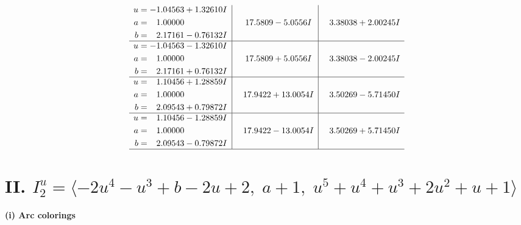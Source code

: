 \documentclass[1p]{elsarticle_modified}
\theoremstyle{definition}
\begin{document}
$$\begin{array}{c|c|c}
\begin{aligned}
u &= -1.04563 + 1.32610 I \\
a &= \phantom{-}1.00000\phantom{ +0.000000I} \\
b &= \phantom{-}2.17161 - 0.76132 I\end{aligned}
 & \phantom{-}17.5809 - 5.0556 I & \phantom{-}3.38038 + 2.00245 I \\ \hline\begin{aligned}
u &= -1.04563 - 1.32610 I \\
a &= \phantom{-}1.00000\phantom{ +0.000000I} \\
b &= \phantom{-}2.17161 + 0.76132 I\end{aligned}
 & \phantom{-}17.5809 + 5.0556 I & \phantom{-}3.38038 - 2.00245 I \\ \hline\begin{aligned}
u &= \phantom{-}1.10456 + 1.28859 I \\
a &= \phantom{-}1.00000\phantom{ +0.000000I} \\
b &= \phantom{-}2.09543 + 0.79872 I\end{aligned}
 & \phantom{-}17.9422 + 13.0054 I & \phantom{-}3.50269 - 5.71450 I \\ \hline\begin{aligned}
u &= \phantom{-}1.10456 - 1.28859 I \\
a &= \phantom{-}1.00000\phantom{ +0.000000I} \\
b &= \phantom{-}2.09543 - 0.79872 I\end{aligned}
 & \phantom{-}17.9422 - 13.0054 I & \phantom{-}3.50269 + 5.71450 I\\
 \hline 
 \end{array}$$\newpage\newpage\renewcommand{\arraystretch}{1}
\centering \section*{II. $I^u_{2}= \langle -2 u^4- u^3+b-2 u+2,\;a+1,\;u^5+u^4+u^3+2 u^2+u+1 \rangle$}
\flushleft \textbf{(i) Arc colorings}\\
\end{document}

